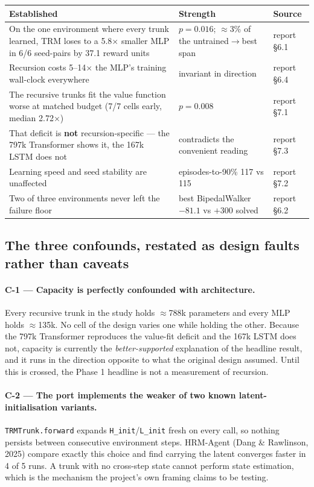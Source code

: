 \documentclass[11pt]{article}
\newcommand{\code}[1]{\texttt{\small #1}}
\begin{document}
\begin{center}
\begin{tabular}{@{}p{}p{}p{}@{}}
\toprule
\textbf{Established} & \textbf{Strength} & \textbf{Source} \\
\midrule
On the one environment where every trunk learned, TRM loses to a 5.8$\times$ smaller MLP in 6/6 seed-pairs by 37.1 reward units & $p = 0.016$; $\approx$3\% of the untrained$\to$best span & report \S6.1 \\
Recursion costs 5--14$\times$ the MLP's training wall-clock everywhere & invariant in direction & report \S6.4 \\
The recursive trunks fit the value function worse at matched budget (7/7 cells early, median 2.72$\times$) & $p = 0.008$ & report \S7.1 \\
That deficit is \textbf{not} recursion-specific --- the 797k Transformer shows it, the 167k LSTM does not & contradicts the convenient reading & report \S7.3 \\
Learning speed and seed stability are unaffected & episodes-to-90\% 117 vs 115 & report \S7.2 \\
Two of three environments never left the failure floor & best BipedalWalker $-81.1$ vs $+300$ solved & report \S6.2 \\
\bottomrule
\end{tabular}
\end{center}

\subsection{The three confounds, restated as design faults rather than caveats}

\paragraph{C-1 --- Capacity is perfectly confounded with architecture.} Every recursive trunk in the study holds $\approx$788k parameters and every MLP holds $\approx$135k. No cell of the design varies one while holding the other. Because the 797k Transformer reproduces the value-fit deficit and the 167k LSTM does not, capacity is currently the \emph{better-supported} explanation of the headline result, and it runs in the direction opposite to what the original design assumed. Until this is crossed, the Phase 1 headline is not a measurement of recursion.

\paragraph{C-2 --- The port implements the weaker of two known latent-initialisation variants.} \code{TRMTrunk.forward} expands \code{H\_init}/\code{L\_init} fresh on every call, so nothing persists between consecutive environment steps. HRM-Agent (Dang \& Rawlinson, 2025) compare exactly this choice and find carrying the latent converges faster in 4 of 5 runs. A trunk with no cross-step state cannot perform state estimation, which is the mechanism the project's own framing claims to be testing.
\end{document}
